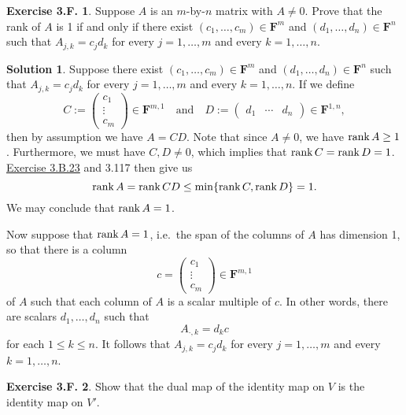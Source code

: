 \documentclass[12pt]{article}
\theoremstyle{definition}
\theoremstyle{exercise}
\newtheorem{exercise}{Exercise 3.F.}
\theoremstyle{solution}
\newtheorem*{solution}{Solution}
\newcommand{\Rank}{\text{rank\,}}
\newcommand{\quand}{\quad \text{and} \quad}
\newcommand{\F}{\mathbf{F}}
\begin{document}
\begin{exercise}
\label{ex:11}
    Suppose \( A \) is an \(m\)-by-\(n\) matrix with \( A \neq 0 \). Prove that the rank of \( A \) is 1 if and only if there exist \( (c_1, \ldots, c_m) \in \F^m \) and \( (d_1, \ldots, d_n) \in \F^n \) such that \( A_{j,k} = c_j d_k \) for every \( j = 1, \ldots, m \) and every \( k = 1, \ldots, n \).
\end{exercise}

\begin{solution}
    Suppose there exist \( (c_1, \ldots, c_m) \in \F^m \) and \( (d_1, \ldots, d_n) \in \F^n \) such that \( A_{j,k} = c_j d_k \) for every \( j = 1, \ldots, m \) and every \( k = 1, \ldots, n \). If we define
    \[
        C := \begin{pmatrix}
            c_1 \\
            \vdots \\
            c_m
        \end{pmatrix} \in \F^{m,1}
        \quand
        D:= \begin{pmatrix}
            d_1 & \cdots & d_n
        \end{pmatrix} \in \F^{1,n},
    \]
    then by assumption we have \( A = CD \). Note that since \( A \neq 0 \), we have \( \Rank A \geq 1 \). Furthermore, we must have \( C, D \neq 0 \), which implies that \( \Rank C = \Rank D = 1 \). \href{https://lew98.github.io/Mathematics/LADR_Section_3_B_Exercises.pdf}{Exercise 3.B.23} and 3.117 then give us
    \[
        \Rank A = \Rank CD \leq \min \{ \Rank C, \Rank D \} = 1.
    \]
    We may conclude that \( \Rank A = 1 \).

    Now suppose that \( \Rank A = 1 \), i.e.\ the span of the columns of \( A \) has dimension 1, so that there is a column
    \[
        c = \begin{pmatrix}
            c_1 \\
            \vdots \\
            c_m
        \end{pmatrix} \in \F^{m,1}
    \]
    of \( A \) such that each column of \( A \) is a scalar multiple of \( c \). In other words, there are scalars \( d_1, \ldots, d_n \) such that
    \[
        A_{\cdot,k} = d_k c
    \]
    for each \( 1 \leq k \leq n \). It follows that \( A_{j,k} = c_j d_k \) for every \( j = 1, \ldots, m \) and every \( k = 1, \ldots, n \).
\end{solution}

\begin{exercise}
\label{ex:12}
    Show that the dual map of the identity map on \( V \) is the identity map on \( V' \).
\end{exercise}
\end{document}
